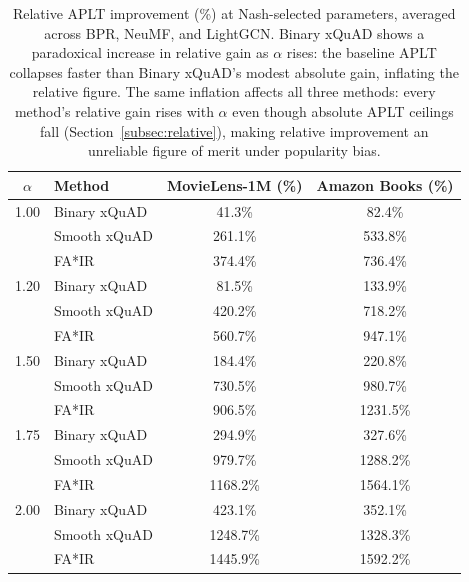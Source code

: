 \begin{table}[htbp]
\centering
\caption{Relative APLT improvement (\%) at Nash-selected parameters, averaged across BPR, NeuMF, and LightGCN. Binary xQuAD shows a paradoxical increase in relative gain as $\alpha$ rises: the baseline APLT collapses faster than Binary xQuAD's modest absolute gain, inflating the relative figure. The same inflation affects all three methods: every method's relative gain rises with $\alpha$ even though absolute APLT ceilings fall (Section~\ref{subsec:relative}), making relative improvement an unreliable figure of merit under popularity bias.}
\label{tab:relative_improvement}
\begin{tabular}{clcc}
\toprule
$\alpha$ & Method & MovieLens-1M (\%) & Amazon Books (\%) \\
\midrule
1.00 & Binary xQuAD & 41.3\% & 82.4\% \\
\rowcolor{gray!6}  & Smooth xQuAD & 261.1\% & 533.8\% \\
 & FA*IR & 374.4\% & 736.4\% \\
\midrule
1.20 & Binary xQuAD & 81.5\% & 133.9\% \\
\rowcolor{gray!6}  & Smooth xQuAD & 420.2\% & 718.2\% \\
 & FA*IR & 560.7\% & 947.1\% \\
\midrule
1.50 & Binary xQuAD & 184.4\% & 220.8\% \\
\rowcolor{gray!6}  & Smooth xQuAD & 730.5\% & 980.7\% \\
 & FA*IR & 906.5\% & 1231.5\% \\
\midrule
1.75 & Binary xQuAD & 294.9\% & 327.6\% \\
\rowcolor{gray!6}  & Smooth xQuAD & 979.7\% & 1288.2\% \\
 & FA*IR & 1168.2\% & 1564.1\% \\
\midrule
2.00 & Binary xQuAD & 423.1\% & 352.1\% \\
\rowcolor{gray!6}  & Smooth xQuAD & 1248.7\% & 1328.3\% \\
 & FA*IR & 1445.9\% & 1592.2\% \\
\bottomrule
\end{tabular}
\end{table}